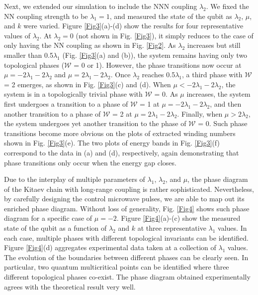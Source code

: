 \documentclass[aps,reprint,groupedaddress,showpacs,superscriptaddress]{revtex4-1}
\begin{document}
Next, we extended our simulation to include the NNN coupling $\lambda_{2}$. We fixed the NN coupling strength to be $\lambda_{1}=1$, and measured the state of the qubit as $\lambda_{2}$, $\mu$, and $k$ were varied. Figure \ref{Fig3}(a)-(d) show the results for four representative values of $\lambda_{2}$. At $\lambda_{2}=0$ (not shown in Fig. \ref{Fig3}), it simply reduces to the case of only having the NN coupling as shown in Fig. \ref{Fig2}. As $\lambda_{2}$ increases but still smaller than 0.5$\lambda_{1}$ (Fig. \ref{Fig3}(a) and (b)), the system remains having only two topological phases ($\mathcal{W}$ = 0 or 1). However, the phase transitions now occur at $\mu=-2\lambda_{1}-2\lambda_{2}$ and $\mu=2\lambda_{1}-2\lambda_{2}$. Once $\lambda_{2}$ reaches 0.5$\lambda_{1}$, a third phase with $\mathcal{W}$ = 2 emerges, as shown in Fig. \ref{Fig3}(c) and (d). When $\mu<-2\lambda_{1}-2\lambda_{2}$, the system is in a topologically trivial phase with $\mathcal{W}$ = 0. As $\mu$ increases, the system first undergoes a transition to a phase of $\mathcal{W}$ = 1 at $\mu=-2\lambda_{1}-2\lambda_{2}$, and then another transition to a phase of $\mathcal{W}$ = 2 at $\mu=2\lambda_{1}-2\lambda_{2}$. Finally, when $\mu>2\lambda_{2}$, the system undergoes yet another transition to the phase of $\mathcal{W}$ = 0. Such phase transitions become more obvious on the plots of extracted winding numbers shown in Fig. \ref{Fig3}(e). The two plots of energy bands in Fig. \ref{Fig3}(f) correspond to the data in (a) and (d), respectively, again demonstrating that phase transitions only occur when the energy gap closes. 

Due to the interplay of multiple parameters of $\lambda_{1}$, $\lambda_{2}$, and $\mu$, the phase diagram of the Kitaev chain with long-range coupling is rather sophisticated. Nevertheless, by carefully designing the control microwave pulses, we are able to map out its enriched phase diagram. Without loss of generality, Fig. \ref{Fig4} shows such phase diagram for a specific case of $\mu=-2$. Figure \ref{Fig4}(a)-(c) show the measured state of the qubit as a function of $\lambda_{2}$ and $k$ at three representative $\lambda_{1}$ values. In each case, multiple phases with different topological invariants can be identified. Figure \ref{Fig4}(d) aggregates experimental data taken at a collection of $\lambda_{1}$ values. The evolution of the boundaries between different phases can be clearly seen. In particular, two quantum multicritical points can be identified where three different topological phases co-exist. The phase diagram obtained experimentally agrees with the theoretical result very well\cite{Kopp2005,Niu2012,Zhang2015}.      
\end{document}
